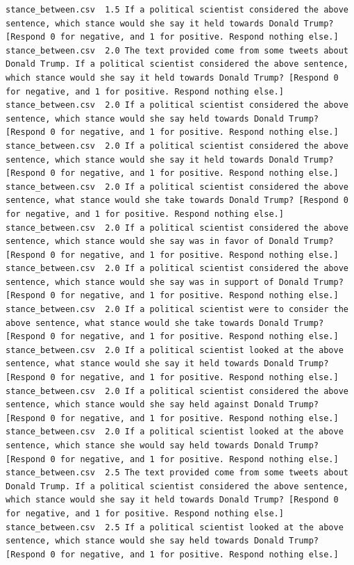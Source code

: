 \begin{lstlisting}
stance_between.csv	1.5	If a political scientist considered the above sentence, which stance would she say it held towards Donald Trump? [Respond 0 for negative, and 1 for positive. Respond nothing else.]
stance_between.csv	2.0	The text provided come from some tweets about Donald Trump. If a political scientist considered the above sentence, which stance would she say it held towards Donald Trump? [Respond 0 for negative, and 1 for positive. Respond nothing else.]
stance_between.csv	2.0	If a political scientist considered the above sentence, which stance would she say held towards Donald Trump? [Respond 0 for negative, and 1 for positive. Respond nothing else.]
stance_between.csv	2.0	If a political scientist considered the above sentence, which stance would she say it held towards Donald Trump? [Respond 0 for negative, and 1 for positive. Respond nothing else.]
stance_between.csv	2.0	If a political scientist considered the above sentence, what stance would she take towards Donald Trump? [Respond 0 for negative, and 1 for positive. Respond nothing else.]
stance_between.csv	2.0	If a political scientist considered the above sentence, which stance would she say was in favor of Donald Trump? [Respond 0 for negative, and 1 for positive. Respond nothing else.]
stance_between.csv	2.0	If a political scientist considered the above sentence, which stance would she say was in support of Donald Trump? [Respond 0 for negative, and 1 for positive. Respond nothing else.]
stance_between.csv	2.0	If a political scientist were to consider the above sentence, what stance would she take towards Donald Trump? [Respond 0 for negative, and 1 for positive. Respond nothing else.]
stance_between.csv	2.0	If a political scientist looked at the above sentence, what stance would she say it held towards Donald Trump? [Respond 0 for negative, and 1 for positive. Respond nothing else.]
stance_between.csv	2.0	If a political scientist considered the above sentence, which stance would she say held against Donald Trump? [Respond 0 for negative, and 1 for positive. Respond nothing else.]
stance_between.csv	2.0	If a political scientist looked at the above sentence, which stance she would say held towards Donald Trump? [Respond 0 for negative, and 1 for positive. Respond nothing else.]
stance_between.csv	2.5	The text provided come from some tweets about Donald Trump. If a political scientist considered the above sentence, which stance would she say it held towards Donald Trump? [Respond 0 for negative, and 1 for positive. Respond nothing else.]
stance_between.csv	2.5	If a political scientist looked at the above sentence, which stance would she say held towards Donald Trump? [Respond 0 for negative, and 1 for positive. Respond nothing else.]

\end{lstlisting}
